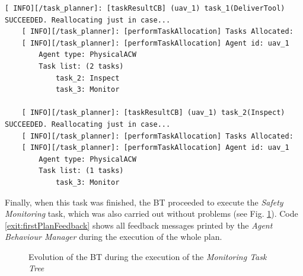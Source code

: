 \begin{lstlisting}[caption={Feedback messages printed out during replanning that were carried out when tasks were completed}, breaklines=true, label=exit:tasksFInishAndReplanning]
    [ INFO][/task_planner]: [taskResultCB] (uav_1) task_1(DeliverTool) SUCCEEDED. Reallocating just in case...
    [ INFO][/task_planner]: [performTaskAllocation] Tasks Allocated:
    [ INFO][/task_planner]: [performTaskAllocation] Agent id: uav_1
        Agent type: PhysicalACW
        Task list: (2 tasks)
            task_2: Inspect
            task_3: Monitor
    
    [ INFO][/task_planner]: [taskResultCB] (uav_1) task_2(Inspect) SUCCEEDED. Reallocating just in case...
    [ INFO][/task_planner]: [performTaskAllocation] Tasks Allocated:
    [ INFO][/task_planner]: [performTaskAllocation] Agent id: uav_1
        Agent type: PhysicalACW
        Task list: (1 tasks)
            task_3: Monitor
\end{lstlisting}

Finally, when this task was finished, the \gls{BT} proceeded to execute the \emph{Safety Monitoring} task, which was also carried out without problems (see Fig. \ref{fig:Gazebo_MonitorTree}). Code \ref{exit:firstPlanFeedback} shows all feedback messages printed by the \emph{Agent Behaviour Manager} during the execution of the whole plan. 

\begin{figure}[htbp]
    \centering
    \hfill
    \caption{Evolution of the \gls{BT} during the execution of the \emph{Monitoring Task Tree}}
    \label{fig:Gazebo_MonitorTree}
\end{figure}

